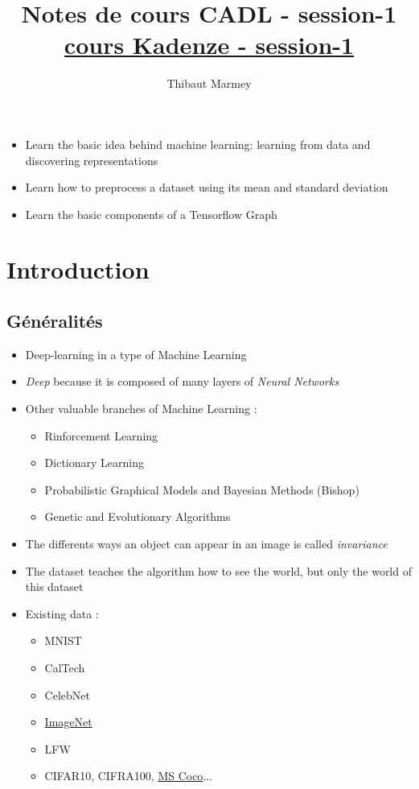 \documentclass[12pt,a4paper]{article}
\author{Thibaut Marmey}
\title{Notes de cours CADL - session-1\\
\normalsize \href{https://www.kadenze.com/courses/creative-applications-of-deep-learning-with-tensorflow-iv/sessions/introduction-to-tensorflow}{cours Kadenze - session-1}}
\begin{document}
	\maketitle

\begin{scriptsize} \begin{itemize}
\item Learn the basic idea behind machine learning: learning from data and discovering representations
\item Learn how to preprocess a dataset using its mean and standard deviation
\item Learn the basic components of a Tensorflow Graph
\end{itemize}\end{scriptsize}

\begin{normalsize}
\tableofcontents
\end{normalsize}

\section{Introduction}
\subsection{Généralités}
\begin{itemize}
\item Deep-learning in a type of Machine Learning
\item \textit{Deep} because it is composed of many layers of \textit{Neural Networks}
\item Other valuable branches of Machine Learning :
\begin{itemize}
\item Rinforcement Learning
\item Dictionary Learning
\item Probabilistic Graphical Models and Bayesian Methods (Bishop)
\item Genetic and Evolutionary Algorithms
\end{itemize}
\item The differents ways an object can appear in an image is called \textit{invariance}
\item The dataset teaches the algorithm how to see the world, but only the world of this dataset
\item Existing data :
\begin{itemize}
\item MNIST
\item CalTech
\item CelebNet
\item \href{http://www.image-net.org/}{ImageNet}
\item LFW
\item CIFAR10, CIFRA100, \href{http://mscoco.org/home/}{MS Coco}...
\end{itemize}
\end{itemize}
\end{document}
